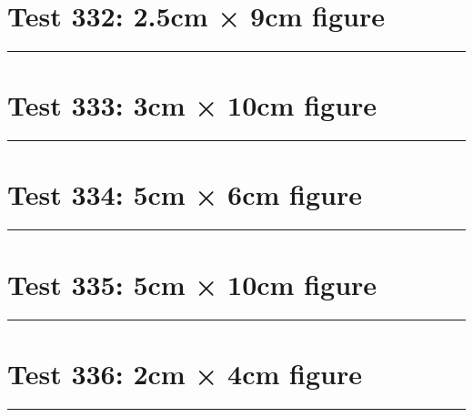 \documentclass[a4paper,11pt]{article}
\begin{document}
\section*{Test 332: 2.5cm × 9cm figure}
\begin{swarmwrap}%
  \begin{minipage}[t]{2cm}
    \centering
    \rule{\linewidth}{9cm}
  \end{minipage}%
\end{swarmwrap}%
\swarmwrapnext
\lipsum[29]
\lipsum[30]
\lipsum[31]
\lipsum[32]
\section*{Test 333: 3cm × 10cm figure}
\begin{swarmwrap}%
  \begin{minipage}[t]{3cm}
    \centering
    \rule{\linewidth}{10cm}
  \end{minipage}%
\end{swarmwrap}%
\swarmwrapnext
\lipsum[31]
\lipsum[32]
\lipsum[33]
\lipsum[34]
\lipsum[35]
\section*{Test 334: 5cm × 6cm figure}
\begin{swarmwrap}%
  \begin{minipage}[t]{5cm}
    \centering
    \rule{\linewidth}{6cm}
  \end{minipage}%
\end{swarmwrap}%
\swarmwrapnext
\lipsum[111]
\lipsum[112]
\lipsum[113]
\lipsum[114]
\section*{Test 335: 5cm × 10cm figure}
\begin{swarmwrap}%
  \begin{minipage}[t]{5cm}
    \centering
    \rule{\linewidth}{10cm}
  \end{minipage}%
\end{swarmwrap}%
\swarmwrapnext
\lipsum[70]
\lipsum[71]
\lipsum[72]
\section*{Test 336: 2cm × 4cm figure}
\begin{swarmwrap}%
  \begin{minipage}[t]{2cm}
    \centering
    \rule{\linewidth}{4cm}
  \end{minipage}%
\end{swarmwrap}%
\swarmwrapnext
\lipsum[81]
\lipsum[82]
\lipsum[83]
\lipsum[84]
\lipsum[85]
\end{document}
